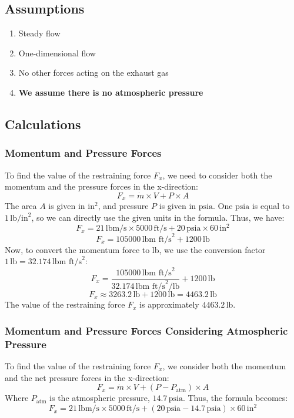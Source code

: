 \documentclass{article}
\begin{document}
\subsection*{Assumptions}
\begin{enumerate}
    \item Steady flow
    \item One-dimensional flow
    \item No other forces acting on the exhaust gas
    \item \textbf{We assume there is no atmospheric pressure}
\end{enumerate}

\subsection*{Calculations}
\subsubsection*{Momentum and Pressure Forces}
To find the value of the restraining force \( F_x \), we need to consider both the momentum and the pressure forces in the x-direction:
\[
F_x = \dot{m} \times V + P \times A
\]
The area \( A \) is given in \( \text{in}^2 \), and pressure \( P \) is given in \( \text{psia} \). One \( \text{psia} \) is equal to \( 1 \, \text{lb/in}^2 \), so we can directly use the given units in the formula. Thus, we have:
\[
F_x = 21 \, \text{lbm/s} \times 5000 \, \text{ft/s} + 20 \, \text{psia} \times 60 \, \text{in}^2
\]
\[
F_x = 105000 \, \text{lbm ft/s}^2 + 1200 \, \text{lb}
\]
Now, to convert the momentum force to lb, we use the conversion factor \(1 \, \text{lb} = 32.174 \, \text{lbm ft/s}^2\):
\[
F_x = \frac{105000 \, \text{lbm ft/s}^2}{32.174 \, \text{lbm ft/s}^2/\text{lb}} + 1200 \, \text{lb}
\]
\[
F_x \approx 3263.2 \, \text{lb} + 1200 \, \text{lb} = 4463.2 \, \text{lb}
\]
The value of the restraining force \( F_x \) is approximately \( 4463.2 \, \text{lb} \).
\subsubsection*{Momentum and Pressure Forces Considering Atmospheric Pressure}
To find the value of the restraining force \( F_x \), we consider both the momentum and the net pressure forces in the x-direction:
\[
F_x = \dot{m} \times V + (P - P_{\text{atm}}) \times A
\]
Where \( P_{\text{atm}} \) is the atmospheric pressure, \( 14.7 \, \text{psia} \). Thus, the formula becomes:
\[
F_x = 21 \, \text{lbm/s} \times 5000 \, \text{ft/s} + (20 \, \text{psia} - 14.7 \, \text{psia}) \times 60 \, \text{in}^2
\]
\end{document}
